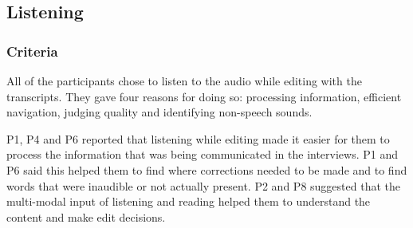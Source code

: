 



\subsection{Listening}

\subsubsection{Criteria}

All of the participants chose to listen to the audio while editing with the transcripts. They gave four reasons for
doing so: processing information, efficient navigation, judging quality and identifying non-speech sounds.

P1, P4 and P6 reported that listening while editing made it easier for them to process the information that was being
communicated in the interviews.  P1 and P6 said this helped them to find where corrections needed to be made and to find
words that were inaudible or not actually present.  P2 and P8 suggested that the multi-modal input of listening and
reading helped them to understand the content and make edit decisions.

